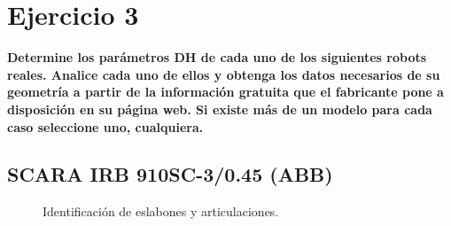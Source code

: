 \documentclass[a4paper,12pt]{article}
\begin{document}
\section{Ejercicio 3}
\textbf{Determine los parámetros DH de cada uno de los siguientes robots reales. Analice
cada uno de ellos y obtenga los datos necesarios de su geometría a partir de la información
gratuita que el fabricante pone a disposición en su página web. Si existe más de un modelo
para cada caso seleccione uno, cualquiera.}

\subsection{SCARA IRB 910SC-3/0.45 (ABB)}
\label{subsec: robot 4}

\begin{figure}[H]
    \centering
    \begin{adjustbox}{scale = 0.662, max width=\columnwidth}
    \end{adjustbox}
    \caption{Identificación de eslabones y articulaciones.}
    \label{scara_eslabones_articulaciones}
\end{figure}
\end{document}
